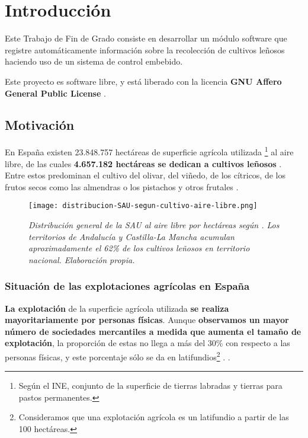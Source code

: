 \chapter{Introducción}

Este Trabajo de Fin de Grado consiste en desarrollar un módulo
software que registre automáticamente información sobre
la recolección de cultivos leñosos haciendo uso de un
sistema de control embebido.

Este proyecto es software libre, y está liberado con
la licencia \textbf{GNU Affero General Public License} \cite{agplv3}.

\section{Motivación}

En España existen 23.848.757 hectáreas de superficie agrícola utilizada%
\footnote{%
Según el INE, conjunto de la superficie de tierras labradas y tierras
para pastos permanentes.
}%
al aire libre, de las cuales \textbf{4.657.182 hectáreas se dedican a cultivos leñosos}
 \cite{INEdistribucionDeLaSuperficiePorTamaño}.
Entre estos predominan el cultivo del olivar, del viñedo, de los cítricos,
de los frutos secos como las almendras o los pistachos y otros frutales
 \cite{INEpanoramicaCensoAgrario}.

\begin{figure}[!b]
    \centering
    \texttt{[image: distribucion-SAU-segun-cultivo-aire-libre.png]}
    \caption{\textit{Distribución general de la SAU al aire libre por hectáreas
    según \cite{INEdistribucionDeLaSuperficiePorTamaño}. Los territorios de Andalucía y Castilla-La Mancha
    acumulan aproximadamente el 62\% de los cultivos leñosos en territorio nacional.
    Elaboración propia.}}
\end{figure}

\subsection{Situación de las explotaciones agrícolas en España}

\textbf{La explotación} de la superficie agrícola utilizada \textbf{se realiza mayoritariamente por personas
físicas}. Aunque \textbf{observamos un mayor número de sociedades mercantiles
a medida que aumenta el tamaño de explotación}, la proporción de estas no llega a más del 30\%
con respecto a las personas físicas, y este porcentaje sólo se da en latifundios\footnote{%
    Consideramos que una explotación agrícola es un latifundio a partir de las 100 hectáreas.
}%
.
 \cite[Personalidad jurídica según el tamaño de explotación]{INEpanoramicaCensoAgrario}.

